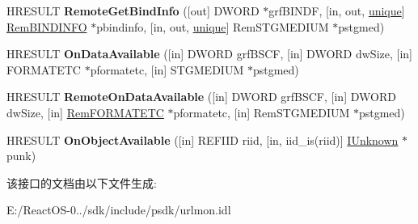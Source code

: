 \begin{DoxyCompactItemize}
\item 
\mbox{\label{interface_i_bind_status_callback_a4075c6009fa345caf5fa42ac45cdb8c6}} 
H\+R\+E\+S\+U\+LT {\bfseries Remote\+Get\+Bind\+Info} (\mbox{[}out\mbox{]} D\+W\+O\+RD $\ast$grf\+B\+I\+N\+DF, \mbox{[}in, out, \hyperlink{interfaceunique}{unique}\mbox{]} \hyperlink{struct_i_bind_status_callback_1_1__tag_rem_b_i_n_d_i_n_f_o}{Rem\+B\+I\+N\+D\+I\+N\+FO} $\ast$pbindinfo, \mbox{[}in, out, \hyperlink{interfaceunique}{unique}\mbox{]} Rem\+S\+T\+G\+M\+E\+D\+I\+UM $\ast$pstgmed)
\item 
\mbox{\label{interface_i_bind_status_callback_a59eb47ab24bc71bc3c53d49b732e5788}} 
H\+R\+E\+S\+U\+LT {\bfseries On\+Data\+Available} (\mbox{[}in\mbox{]} D\+W\+O\+RD grf\+B\+S\+CF, \mbox{[}in\mbox{]} D\+W\+O\+RD dw\+Size, \mbox{[}in\mbox{]} F\+O\+R\+M\+A\+T\+E\+TC $\ast$pformatetc, \mbox{[}in\mbox{]} S\+T\+G\+M\+E\+D\+I\+UM $\ast$pstgmed)
\item 
\mbox{\label{interface_i_bind_status_callback_a09b4105870eb09b450ba30d40b012925}} 
H\+R\+E\+S\+U\+LT {\bfseries Remote\+On\+Data\+Available} (\mbox{[}in\mbox{]} D\+W\+O\+RD grf\+B\+S\+CF, \mbox{[}in\mbox{]} D\+W\+O\+RD dw\+Size, \mbox{[}in\mbox{]} \hyperlink{struct_i_bind_status_callback_1_1tag_rem_f_o_r_m_a_t_e_t_c}{Rem\+F\+O\+R\+M\+A\+T\+E\+TC} $\ast$pformatetc, \mbox{[}in\mbox{]} Rem\+S\+T\+G\+M\+E\+D\+I\+UM $\ast$pstgmed)
\item 
\mbox{\label{interface_i_bind_status_callback_a6ffc777c8debc8031e50324a145b1ade}} 
H\+R\+E\+S\+U\+LT {\bfseries On\+Object\+Available} (\mbox{[}in\mbox{]} R\+E\+F\+I\+ID riid, \mbox{[}in, iid\+\_\+is(riid)\mbox{]} \hyperlink{interface_i_unknown}{I\+Unknown} $\ast$punk)
\end{DoxyCompactItemize}


该接口的文档由以下文件生成\+:\begin{DoxyCompactItemize}
\item 
E\+:/\+React\+O\+S-\/0../sdk/include/psdk/urlmon.\+idl\end{DoxyCompactItemize}

